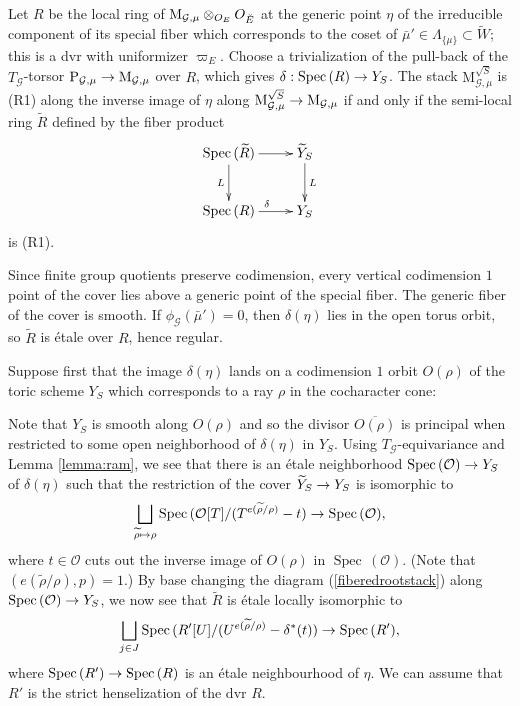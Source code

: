 \documentclass[reqno, 10pt]{amsart}
\makeatletter
\newcommand{\CG}{\ensuremath{\mathcal {G}}\xspace}
\newcommand{\CO}{\ensuremath{\mathcal {O}}\xspace}
\DeclareMathOperator{\Spec}{Spec\,}
\newcommand{\wt}{\widetilde}
\newcommand{\ov}{\overline}
\theoremstyle{definition}
\numberwithin{equation}{subsection}
\numberwithin{subsubsection}{subsection}
\renewcommand{\to}{%
   \ifbool{@display}{\longrightarrow}{\rightarrow}%
   }
\let\shortmapsto\mapsto
\renewcommand{\mapsto}{%
   \ifbool{@display}{\shortmapsto}{\shortmapsto}%
   }
\newcommand{\br}{\breve}
\newcommand{\Mloc}{{\rm M}}
\newcommand{\Mlocroot}{{\mathrm M}^{\sqrt{S}}}
\makeatother
\begin{document}
Let $R$ be the local ring of $\Mloc_{\CG,\mu}\otimes_{O_E}O_{\br E}$ at the generic point $\eta$ of the irreducible component of its special fiber which corresponds
to the coset of $\bar\mu'\in \Lambda_{\{\mu\}}\subset \wt W$; this is a dvr with uniformizer $\varpi_E$. Choose a trivialization of the pull-back of the  $T_\CG$-torsor ${\rm P}_{\CG,\mu}\to \Mloc_{\CG,\mu}$ over $R$,
which gives $\delta: \Spec(R)\to Y_S$. The stack $\Mlocroot_{\CG,\mu}$ is (R1) along the inverse image of $\eta$ along $\Mlocroot_{\CG,\mu}\to \Mloc_{\CG,\mu}$ if and only if  the semi-local ring $\wt R$ defined by the fiber product
\begin{equation}\label{fiberedrootstack}
\begin{aligned}
 \xymatrix{
      \Spec(\wt R) \ar[r] \ar[d]_L  &     \wt Y_S   \ar[d]^L \\
       \Spec(R)\ar[r]^\delta &   Y_S   
        }
        \end{aligned}
\end{equation}
is  (R1).

 Since finite group quotients preserve codimension, every vertical codimension $1$ point of
the cover lies above a generic point of the special fiber. The generic fiber of the cover is smooth.
If $\phi_\CG(\bar\mu')=0$, then $\delta(\eta)$ lies in the open torus orbit, so $\wt R$ is \'etale over $R$, hence regular.

Suppose first that the image $\delta(\eta)$ lands on a codimension $1$ orbit $O(\rho)$ of the toric scheme $Y_S$ which corresponds to a ray $\rho$ in the cocharacter cone:

Note that $Y_S$ is smooth along $O(\rho)$ and so the divisor  $\ov{O(\rho)}$ is principal when restricted to some open neighborhood of $\delta(\eta)$ in $Y_S$. Using $T_\CG$-equivariance and Lemma \ref{lemma:ram}, we see that there is an  \'etale neighborhood $\Spec(\CO)\to Y_S$ of $\delta(\eta)$ such that the restriction of the cover $\wt Y_S\to Y_S$ is isomorphic to 
\[
\bigsqcup_{\wt\rho\mapsto \rho}\Spec(\CO[T]/(T^{e(\wt \rho/\rho)}-t)\to \Spec(\CO),
\]
where $t\in \CO$ cuts out the inverse image of $O(\rho)$ in $\Spec(\CO)$. (Note that $(e(\wt\rho/\rho), p)=1$.) By base changing the diagram (\ref{fiberedrootstack}) along $\Spec(\CO)\to Y_S$, we now see that $\wt R$ is \'etale locally  isomorphic to 
\[
\bigsqcup_{j\in J}\Spec(R'[U]/(U^{e(\wt \rho/\rho)}-\delta^*(t))\to \Spec(R'),
\]
where $\Spec(R')\to \Spec(R)$ is an \'etale neighbourhood  of $\eta$. We can assume that $R'$ is the strict henselization of the dvr $R$. 
\end{document}
